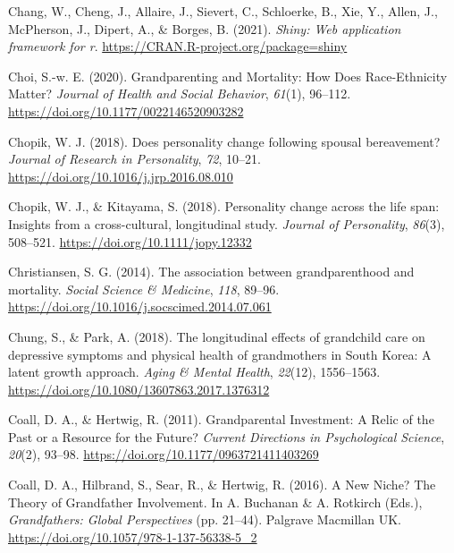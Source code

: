 \documentclass[
  english,
  man,floatsintext]{apa7}
\begin{document}
\leavevmode\hypertarget{ref-R-shiny}{}%
Chang, W., Cheng, J., Allaire, J., Sievert, C., Schloerke, B., Xie, Y., Allen, J., McPherson, J., Dipert, A., \& Borges, B. (2021). \emph{Shiny: Web application framework for r}. \url{https://CRAN.R-project.org/package=shiny}

\leavevmode\hypertarget{ref-choiGrandparentingMortalityHow2020}{}%
Choi, S.-w. E. (2020). Grandparenting and Mortality: How Does Race-Ethnicity Matter? \emph{Journal of Health and Social Behavior}, \emph{61}(1), 96--112. \url{https://doi.org/10.1177/0022146520903282}

\leavevmode\hypertarget{ref-chopikDoesPersonalityChange2018}{}%
Chopik, W. J. (2018). Does personality change following spousal bereavement? \emph{Journal of Research in Personality}, \emph{72}, 10--21. \url{https://doi.org/10.1016/j.jrp.2016.08.010}

\leavevmode\hypertarget{ref-chopikPersonalityChangeLife2018}{}%
Chopik, W. J., \& Kitayama, S. (2018). Personality change across the life span: Insights from a cross-cultural, longitudinal study. \emph{Journal of Personality}, \emph{86}(3), 508--521. \url{https://doi.org/10.1111/jopy.12332}

\leavevmode\hypertarget{ref-christiansenAssociationGrandparenthoodMortality2014}{}%
Christiansen, S. G. (2014). The association between grandparenthood and mortality. \emph{Social Science \& Medicine}, \emph{118}, 89--96. \url{https://doi.org/10.1016/j.socscimed.2014.07.061}

\leavevmode\hypertarget{ref-chungLongitudinalEffectsGrandchild2018}{}%
Chung, S., \& Park, A. (2018). The longitudinal effects of grandchild care on depressive symptoms and physical health of grandmothers in South Korea: A latent growth approach. \emph{Aging \& Mental Health}, \emph{22}(12), 1556--1563. \url{https://doi.org/10.1080/13607863.2017.1376312}

\leavevmode\hypertarget{ref-coallGrandparentalInvestmentRelic2011}{}%
Coall, D. A., \& Hertwig, R. (2011). Grandparental Investment: A Relic of the Past or a Resource for the Future? \emph{Current Directions in Psychological Science}, \emph{20}(2), 93--98. \url{https://doi.org/10.1177/0963721411403269}

\leavevmode\hypertarget{ref-coallNewNicheTheory2016}{}%
Coall, D. A., Hilbrand, S., Sear, R., \& Hertwig, R. (2016). A New Niche? The Theory of Grandfather Involvement. In A. Buchanan \& A. Rotkirch (Eds.), \emph{Grandfathers: Global Perspectives} (pp. 21--44). Palgrave Macmillan UK. \url{https://doi.org/10.1057/978-1-137-56338-5_2}
\end{document}
